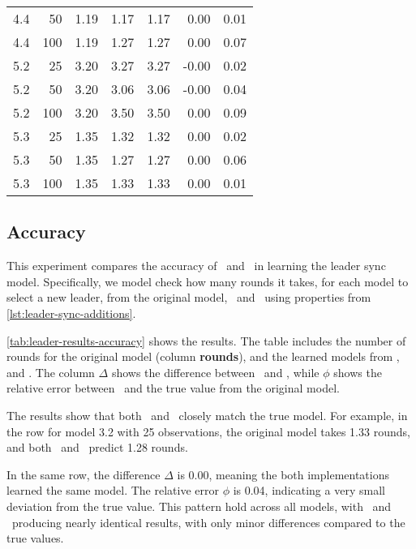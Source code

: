 \begin{table}
\begin{tabular}{rrrrrrr}
        4.4           & 50    & 1.19   & 1.17    & 1.17    & 0.00     & 0.01   \\
        4.4           & 100   & 1.19   & 1.27    & 1.27    & 0.00     & 0.07   \\
        5.2           & 25    & 3.20   & 3.27    & 3.27    & -0.00    & 0.02   \\
        5.2           & 50    & 3.20   & 3.06    & 3.06    & -0.00    & 0.04   \\
        5.2           & 100   & 3.20   & 3.50    & 3.50    & 0.00     & 0.09   \\
        5.3           & 25    & 1.35   & 1.32    & 1.32    & 0.00     & 0.02   \\
        5.3           & 50    & 1.35   & 1.27    & 1.27    & 0.00     & 0.06   \\
        5.3           & 100   & 1.35   & 1.33    & 1.33    & 0.00     & 0.01   \\
        \bottomrule
    \end{tabular}
\end{table}


\subsection{Accuracy}\label{subsec:accuracy}
This experiment compares the accuracy of \Cupaal\ and \Jajapy\ in learning the leader sync model.
Specifically, we model check how many rounds it takes, for each model to select a new leader, from the original model, \Jajapy\ and \Cupaal\ using properties from \autoref{lst:leader-sync-additions}.

\autoref{tab:leader-results-accuracy} shows the results.
The table includes the number of rounds for the original model (column \textbf{rounds}), and the learned models from \Jajapy, and \Cupaal.
The column $\Delta$ shows the difference between \Cupaal\ and \Jajapy, while $\phi$ shows the relative error between \Jajapy\ and the true value from the original model.

The results show that both \Cupaal\ and \Jajapy\ closely match the true model.
For example, in the row for model 3.2 with 25 observations, the original model takes 1.33 rounds, and both \Cupaal\ and \Jajapy\ predict 1.28 rounds.

In the same row, the difference $\Delta$ is 0.00, meaning the both implementations learned the same model.
The relative error $\phi$ is 0.04, indicating a very small deviation from the true value.
This pattern hold across all models, with \Cupaal\ and \Jajapy\ producing nearly identical results, with only minor differences compared to the true values.

